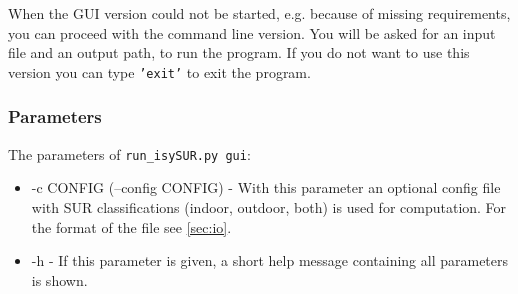 \documentclass[11pt,fleqn]{book} %
\begin{document}
When the GUI version could not be started, e.g. because of missing requirements, you can proceed with the command line version. You will be asked for an input file and an output path, to run the program. If you do not want to use this version you can type \texttt{'exit'} to exit the program.

\subsubsection{Parameters}
The parameters of \texttt{run\_isySUR.py gui}:
\begin{itemize}
	\item -c CONFIG (--config CONFIG) - With this parameter an optional config file with SUR classifications (indoor, outdoor, both) is used for computation. For the format of the file see \ref{sec:io}.
	\item -h - If this parameter is given, a short help message containing all parameters is shown.
\end{itemize}
\end{document}
